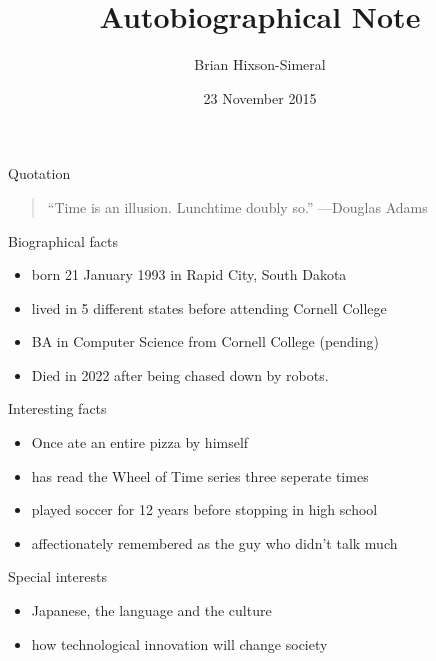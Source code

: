 \documentclass{beamer}
\title{Autobiographical Note}
\author{Brian Hixson-Simeral}
\institute{Cornell College}
\date{23 November 2015}
\begin{document}
\begin{frame}
  \titlepage
\end{frame}

\begin{frame}{Quotation}
\begin{quotation}
\noindent
``Time is an illusion. Lunchtime doubly so.''
  \flushright
  ---Douglas Adams
  \end{quotation}
\end{frame}

\begin{frame}{Biographical facts}
\begin{itemize}
  \item born 21 January 1993 in Rapid City, South Dakota
  \item lived in 5 different states before attending Cornell College
  \item BA in Computer Science from Cornell College (pending)
  \item Died in 2022 after being chased down by robots.
  \end{itemize}
\end{frame}

\begin{frame}{Interesting facts}
\begin{itemize}
  \item Once ate an entire pizza by himself
  \item has read the Wheel of Time series three seperate times
  \item played soccer for 12 years before stopping in high school
  \item affectionately remembered as the guy who didn't talk much
  \end{itemize}
\end{frame}

\begin{frame}{Special interests}
\begin{itemize}
  \item Japanese, the language and the culture
  \item how technological innovation will
    change society
\end{itemize} 
\end{frame}
\end{document}
